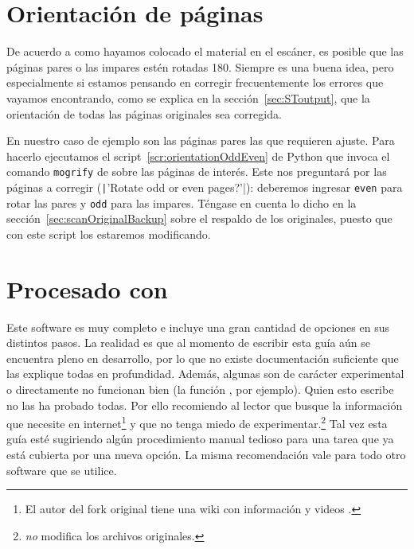 \documentclass[%
	a5paper,
	10pt,
	twoside,
	openright,
	final,
]{memoir}
\begin{document}
	\section{Orientación de páginas\label{sec:fixOrientation}} De acuerdo a como hayamos colocado el material en el escáner, es posible que las páginas pares o las impares estén rotadas 180\textdegree. Siempre es una buena idea, pero especialmente si estamos pensando en corregir frecuentemente los errores que vayamos encontrando, como se explica en la sección~\ref{sec:SToutput}, que la orientación de todas las páginas originales sea corregida.

	En nuestro caso de ejemplo son las páginas pares las que requieren ajuste. Para hacerlo ejecutamos el script~\ref{scr:orientationOddEven} de Python que invoca el comando \texttt{mogrify} de \imagemagick sobre las páginas de interés. Este nos preguntará por las páginas a corregir (\texttt|'Rotate odd or even pages?'|): deberemos ingresar \texttt{even} para rotar las pares y \texttt{odd} para las impares. Téngase en cuenta lo dicho en la sección~\ref{sec:scanOriginalBackup} sobre el respaldo de los originales, puesto que con este script los estaremos modificando.


	\section{Procesado con \scantailor} Este software es muy completo e incluye una gran cantidad de opciones en sus distintos pasos. La realidad es que al momento de escribir esta guía aún se encuentra pleno en desarrollo, por lo que no existe documentación suficiente que las explique todas en profundidad. Además, algunas son de carácter experimental o directamente no funcionan bien (la función , por ejemplo). Quien esto escribe no las ha probado todas. Por ello recomiendo al lector que busque la información que necesite en internet\footnote{El autor del fork original tiene una wiki con información y videos \cite{ScanTailorWiki}.} y que no tenga miedo de experimentar.\footnote{\scantailor \emph{no} modifica los archivos originales.} Tal vez esta guía esté sugiriendo algún procedimiento manual tedioso para una tarea que ya está cubierta por una nueva opción. La misma recomendación vale para todo otro software que se utilice.
\end{document}
